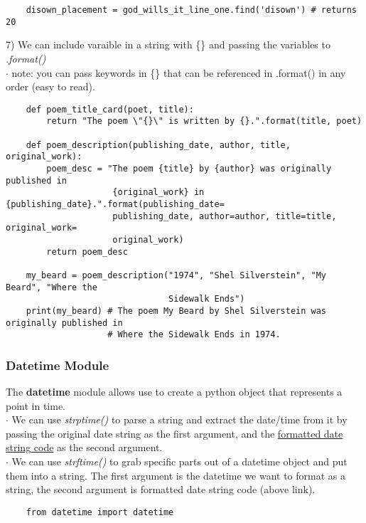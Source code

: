 \documentclass[11pt, a4paper]{article}
\begin{document}
\begin{spacing}{1.1}
\begin{lstlisting}
	disown_placement = god_wills_it_line_one.find('disown') # returns 20 \end{lstlisting}\vspace*{1mm}
	\hspace*{1.5mm} 7) We can include varaible in a string with \{\} and passing the variables to \textit{.format()} \\
	\hspace*{6mm} $\cdot$ note: you can pass keywords in \{\} that can be referenced in .format() in any order (easy to read).
	\begin{lstlisting}
	def poem_title_card(poet, title):
		return "The poem \"{}\" is written by {}.".format(title, poet)
	
	def poem_description(publishing_date, author, title, original_work):
		poem_desc = "The poem {title} by {author} was originally published in 
		             {original_work} in {publishing_date}.".format(publishing_date=
		             publishing_date, author=author, title=title, original_work=
		             original_work)
		return poem_desc
	
	my_beard = poem_description("1974", "Shel Silverstein", "My Beard", "Where the 
	                            Sidewalk Ends")
	print(my_beard) # The poem My Beard by Shel Silverstein was originally published in 
	                # Where the Sidewalk Ends in 1974. \end{lstlisting}\vspace*{4mm}
	                
	\subsubsection{Datetime Module}
	The \textbf{datetime} module allows use to create a python object that represents a point in time. \\
	\hspace*{1.5mm} $\cdot$ We can use \textit{strptime()} to parse a string and extract the date/time from it by passing the original date \hspace*{4mm} string as the first argument, and the \href{https://docs.python.org/3/library/datetime.html#strftime-and-strptime-format-codes}{formatted date string code} as the second argument. \\
	\hspace*{1.5mm} $\cdot$ We can use \textit{strftime()} to grab specific parts out of a datetime object and put them into a string. The \hspace*{4mm} first argument is the datetime we want to format as a string, the second argument is formatted date \hspace*{4mm} string code (above link).
	\begin{lstlisting}
	from datetime import datetime
	

\end{lstlisting}
\end{spacing}
\end{document}
